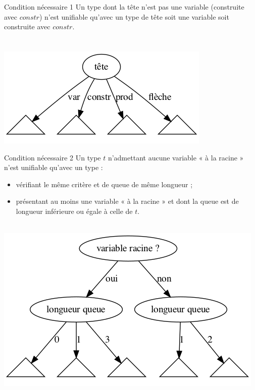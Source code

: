 \documentclass[serif]{beamer}
\newcommand{\?}{\stackrel{?}{=}}
\begin{document}
\begin{frame}{Condition nécessaire 1}
	Un type dont la tête n'est pas une variable (construite avec $constr$) n'est unifiable qu'avec un type de tête soit une variable soit construite avec $constr$. \\
	~\\~\\
	\includegraphics[scale=0.5,center]{graphs/by_head}
\end{frame}


\begin{frame}{Condition nécessaire 2}
	Un type $t$ n'admettant aucune variable « à la racine » n'est unifiable qu'avec un type :
	\begin{itemize}
		\item vérifiant le même critère et de queue de même longueur ;
		\item présentant au moins une variable « à la racine » et dont la queue est de longueur inférieure ou égale à celle de $t$.
	\end{itemize}
	~\\
	\includegraphics[scale=0.4,center]{graphs/by_tail_length}
\end{frame}
\end{document}
